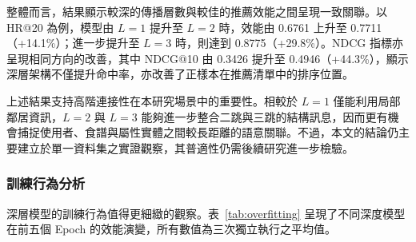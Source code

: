 \begin{table}[htbp]
  \centering
  \caption{GNN 深度對推薦效能的影響（三次獨立執行平均值）}
  \label{tab:depth_progression}
\end{table}

整體而言，結果顯示較深的傳播層數與較佳的推薦效能之間呈現一致關聯。以 HR@20 為例，模型由 $L{=}1$ 提升至 $L{=}2$ 時，效能由 0.6761 上升至 0.7711（+14.1\%）；進一步提升至 $L{=}3$ 時，則達到 0.8775（+29.8\%）。NDCG 指標亦呈現相同方向的改善，其中 NDCG@10 由 0.3426 提升至 0.4946（+44.3\%），顯示深層架構不僅提升命中率，亦改善了正樣本在推薦清單中的排序位置。

上述結果支持高階連接性在本研究場景中的重要性。相較於 $L{=}1$ 僅能利用局部鄰居資訊，$L{=}2$ 與 $L{=}3$ 能夠進一步整合二跳與三跳的結構訊息，因而更有機會捕捉使用者、食譜與屬性實體之間較長距離的語意關聯。不過，本文的結論仍主要建立於單一資料集之實證觀察，其普適性仍需後續研究進一步檢驗。

\subsubsection*{訓練行為分析}

深層模型的訓練行為值得更細緻的觀察。表~\ref{tab:overfitting} 呈現了不同深度模型在前五個 Epoch 的效能演變，所有數值為三次獨立執行之平均值。

